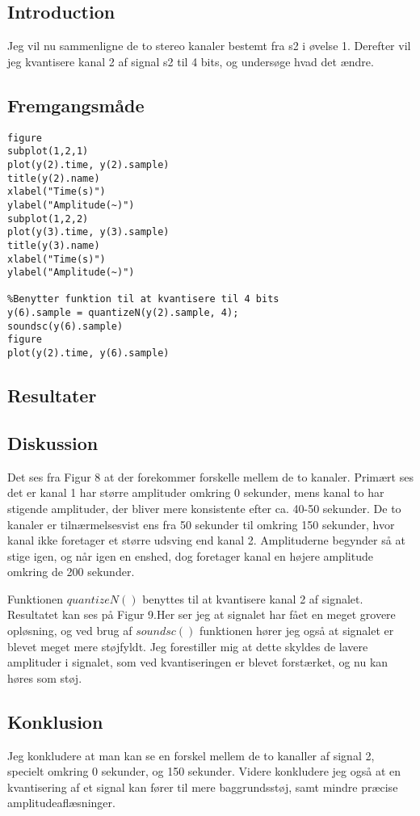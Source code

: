 \documentclass[../main.tex]{subfiles}
\begin{document}
\subsection{Introduction}

Jeg vil nu sammenligne de to stereo kanaler bestemt fra s2 i øvelse 1. Derefter vil jeg kvantisere kanal 2 af signal s2 til 4 bits, og undersøge hvad det ændre.

\subsection{Fremgangsmåde}

\begin{lstlisting}[caption={Matlab kode for øvelse 7 \& 8}, label={lst:myLSTdsdsavadsa}]
figure
subplot(1,2,1)
plot(y(2).time, y(2).sample)
title(y(2).name)
xlabel("Time(s)")
ylabel("Amplitude(~)")
subplot(1,2,2)
plot(y(3).time, y(3).sample)
title(y(3).name)
xlabel("Time(s)")
ylabel("Amplitude(~)")

%Benytter funktion til at kvantisere til 4 bits
y(6).sample = quantizeN(y(2).sample, 4);
soundsc(y(6).sample)
figure
plot(y(2).time, y(6).sample)
\end{lstlisting}

\subsection{Resultater}


\subsection{Diskussion}

Det ses fra Figur 8 at der forekommer forskelle mellem de to kanaler. Primært ses det er kanal 1 har større amplituder omkring 0 sekunder, mens kanal to har stigende amplituder, der bliver mere konsistente efter ca. 40-50 sekunder. De to kanaler er tilnærmelsesvist ens fra 50 sekunder til omkring 150 sekunder, hvor kanal ikke foretager et større udsving end kanal 2. Amplituderne begynder så at stige igen, og når igen en enshed, dog foretager kanal en højere amplitude omkring de 200 sekunder.

Funktionen $quantizeN()$ benyttes til at kvantisere kanal 2 af signalet. Resultatet kan ses på Figur 9.Her ser jeg at signalet har fået en meget grovere opløsning, og ved brug af $soundsc()$ funktionen hører jeg også at signalet er blevet meget mere støjfyldt. Jeg forestiller mig at dette skyldes de lavere amplituder i signalet, som ved kvantiseringen er blevet forstærket, og nu kan høres som støj.

\subsection{Konklusion}
Jeg konkludere at man kan se en forskel mellem de to kanaller af signal 2, specielt omkring 0 sekunder, og 150 sekunder. Videre konkludere jeg også at en kvantisering af et signal kan fører til mere baggrundsstøj, samt mindre præcise amplitudeaflæsninger.
\end{document}
